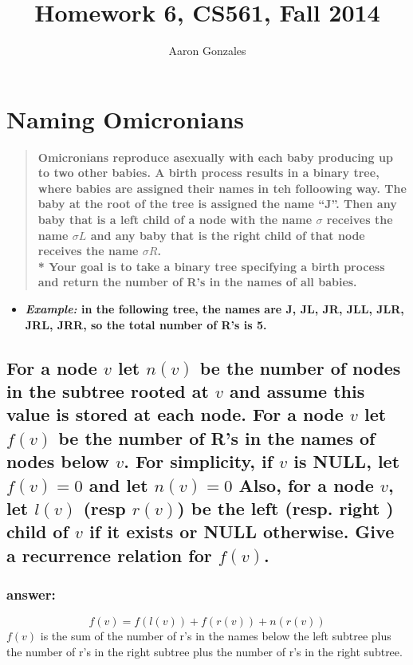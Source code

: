 \documentclass[titlepage]{article}
\theoremstyle{definition}
\begin{document}
\title{Homework 6, CS561, Fall 2014}
\author{Aaron Gonzales}
\maketitle

\section{Naming Omicronians}
  \begin{quote}
    \textbf{Omicronians reproduce asexually with each baby producing up to two
    other babies. A birth process results in a binary tree, where babies are
    assigned their names in teh folloowing way. The baby at the root of the tree
    is assigned the name ``J''. Then any baby that is a left child of a node with
    the name $\sigma$ receives the name $\sigma L$ and any baby that is the right
    child of that node receives the name $\sigma R$. \\*
    Your goal is to take a binary tree specifying a birth process and return the
    number of R's in the names of all babies.}
  \end{quote}
  \begin{itemize}
    \item \textbf{\emph{Example:} in the following tree, the names are J, JL,
    JR, JLL, JLR, JRL, JRR, so the total number of R's is 5.  }
  \end{itemize}

  \subsection{For a node $v$ let $n(v)$ be the number of nodes in the subtree
    rooted at $v$ and assume this value is stored at each node. For a node $v$
    let $f(v)$ be the number of R's in the names of nodes below $v$. For
    simplicity, if $v$ is NULL, let $f(v) = 0$ and let $n(v) = 0$ Also, for a
    node $v$, let $l(v)$ (resp $r(v)$) be the left (resp. right ) child of $v$
    if it exists or NULL otherwise. Give a recurrence relation for $f(v)$.}
    \subsubsection{answer:}
      \[ f(v) = f\left( l (v) \right) + f\left( r (v) \right) + n\left( r(v) \right) \]
      $f(v)$ is the sum of the number of r's in the names below the left subtree plus
      the number of r's in the right subtree plus the number of r's in the right
      subtree.
\end{document}
